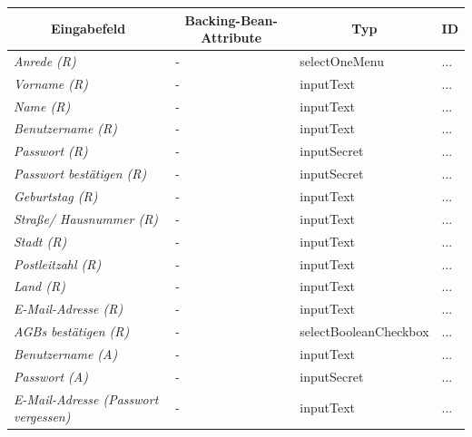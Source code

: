 \begin{itemize}
\begin{itemize}
\begin{center}
\begin{longtable}{|p{3cm} |p{5cm} | p{4cm}|p{3cm}|}
						\hline \multicolumn{1}{|c|}{\textbf{Eingabefeld}} & \multicolumn{1}{|c|}{\textbf{Backing-Bean-Attribute}} & \multicolumn{1}{|c|}{\textbf{Typ}}  &  \multicolumn{1}{|c|}{\textbf{ID}} \\ \hline
						\endfirsthead
						\hline
						\endlastfoot
							\textit{Anrede (R)} & - & selectOneMenu & ... \\ \hline
							\textit{Vorname (R)} & - & inputText & ... \\ \hline
							\textit{Name (R)} & - & inputText & ... \\ \hline
							\textit{Benutzername (R)} & - & inputText & ...\\ \hline
							\textit{Passwort (R)} & - & inputSecret & ... \\ \hline
							\textit{Passwort bestätigen (R)} &- & inputSecret & ...\\ \hline
							\textit{Geburtstag (R)} & - & inputText & ... \\ \hline
							\textit{Straße/ Hausnummer (R)} & - & inputText & ...\\ \hline
							\textit{Stadt (R)} & - & inputText & ... \\ \hline
							\textit{Postleitzahl (R)} & - & inputText & ... \\ \hline
							\textit{Land (R)} & - & inputText & ... \\ \hline
							\textit{E-Mail-Adresse (R)} & - & inputText & ...\\ \hline
							\textit{AGBs bestätigen (R)} & - & selectBooleanCheckbox & ... \\ \hline
							\textit{Benutzername (A)} & - & inputText & ... \\ \hline
							\textit{Passwort (A)} & - & inputSecret & ... \\ \hline
							\textit{E-Mail-Adresse (Passwort vergessen)} & - & inputText & ... \\ \hline
					\end{longtable}
				\end{center}
				
				\begin{center}
					\begin{longtable}{|p{3cm} |p{8cm} | p{5cm}|}
						

\end{longtable}
\end{center}
\end{itemize}
\end{itemize}
